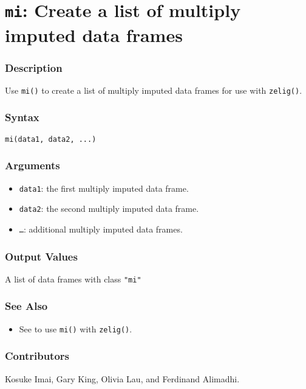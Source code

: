 \section{{\tt mi}: Create a list of multiply imputed data frames}
\label{mi.command}

\subsubsection{Description}

Use {\tt mi()} to create a list of multiply imputed data frames for
use with {\tt zelig()}.  

\subsubsection{Syntax}
\begin{verbatim}
mi(data1, data2, ...)
\end{verbatim}

\subsubsection{Arguments}

\begin{itemize}
\item {\tt data1}:  the first multiply imputed data frame.
\item {\tt data2}: the second multiply imputed data frame.
\item {\tt \dots}: additional multiply imputed data frames.
\end{itemize}

\subsubsection{Output Values}
A list of data frames with class {\tt "mi"}
\subsubsection{See Also}
\begin{itemize}
\item See  to use {\tt mi()} with {\tt zelig()}.  
\end{itemize}

\subsubsection{Contributors}

Kosuke Imai, Gary King, Olivia Lau, and Ferdinand Alimadhi.

